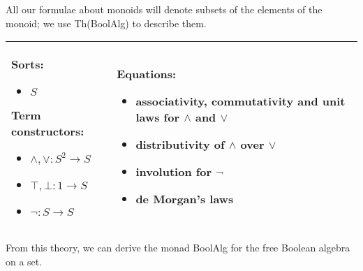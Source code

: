 \documentclass{llncs}
\newcommand{\maps}{\colon}
\renewcommand{\:}{\colon}
\begin{document}
All our formulae about monoids will denote subsets of the elements of the monoid; we use Th(BoolAlg) to describe them.  \begin{center}
  \begin{longtable}{|p{0.3\linewidth}|p{0.7\linewidth}|}
    \hline
    Sorts:
    \begin{itemize}
      \item $S$
    \end{itemize}
    Term constructors:
    \begin{itemize}
      \item $\land, \lor\maps S^2 \to S$
      \item $\top, \bot\maps 1 \to S$
      \item $\neg\maps S \to S$
    \end{itemize}
    &
    Equations:
    \begin{itemize}
      \item \raggedright associativity, commutativity and unit laws for $\land$ and $\lor$
      \item distributivity of $\land$ over $\lor$
      \item involution for $\neg$
      \item de Morgan's laws
    \end{itemize}\\
    \hline
  \end{longtable}
\end{center}
From this theory, we can derive the monad BoolAlg for the free Boolean algebra on a set.
\end{document}
